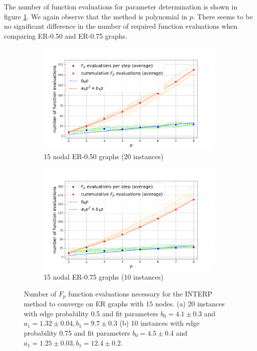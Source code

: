 The number of function evaluations for parameter determination is shown in figure \ref{fig:function-evaluations-ER}. We again observe that the method is polynomial in $p$. There seems to be no significant difference in the number of required function evaluations when comparing ER-0.50 and ER-0.75 graphs.
\begin{figure}[H]
	\centering
	\begin{subfigure}[t]{0.48\textwidth}
		\includegraphics[width=\textwidth]{figures/interp/function_evaluations_15-nodal_ER050.png}
		\caption{15 nodal ER-0.50 graphs (20 instances)}
	\end{subfigure}
	\begin{subfigure}[t]{0.48\textwidth}
		\includegraphics[width=\textwidth]{figures/interp/function_evaluations_15-nodal_ER075.png}
		\caption{15 nodal ER-0.75 graphs (10 instances)}
	\end{subfigure}
	\caption{Number of $F_p$ function evaluations necessary for the INTERP method to converge on ER graphs with 15 nodes. (a) 20 instances with edge probability 0.5 and fit parameters $b_0 = 4.1\pm0.3$ and $a_1=1.32 \pm 0.04, b_1 = 9.7\pm0.3$ (b) 10 instances with edge probability 0.75 and fit parameters $b_0 = 4.5\pm0.4$ and $a_1=1.25 \pm 0.03, b_1 = 12.4\pm0.2$. }
	\label{fig:function-evaluations-ER}
\end{figure}

